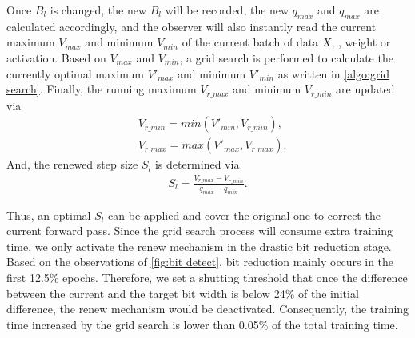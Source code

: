 Once $B_l$ is changed, the new $B_l$ will be recorded, the new $q_{max}$ and $q_{max}$ are calculated accordingly, and the observer will also instantly read the current maximum $V_{max}$ and minimum $V_{min}$ of the current batch of data $X$, \eg, weight or activation. 
Based on $V_{max}$ and $V_{min}$, a grid search is performed to calculate the currently optimal maximum $V'_{max}$ and minimum $V'_{min}$  as written in  \cref{algo:grid search}.  Finally, the running maximum $V_{r\_max}$ and minimum $V_{r\_min}$ are updated via 
\begin{equation}
\begin{split}
    &V_{r\_min} = min(V'_{min},V_{r\_min}),\\&V_{r\_max} = max(V'_{max},V_{r\_max}). 
\end{split}
\end{equation}
And, the renewed step size $S_l$ is determined via
\begin{align}
    S_l=\frac{V_{r\_max}-V_{r\_min}}{q_{max}-q_{min}}.
\end{align}

Thus, an optimal $S_l$ can be applied and cover the original one to correct the current forward pass. 
Since the grid search process will consume extra training time, we only activate the renew mechanism in the drastic bit reduction stage. Based on the observations of  \cref{fig:bit detect}, bit reduction mainly occurs in the first 12.5\% epochs. Therefore, we set a shutting threshold that once the difference between the current and the target bit width is below 24\% of the initial difference, the renew mechanism would be deactivated. Consequently, the training time increased by the grid search is lower than 0.05\% of the total training time.



